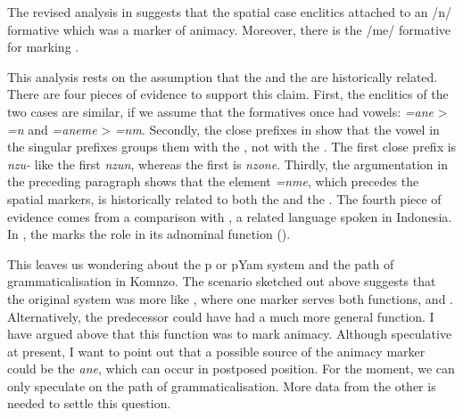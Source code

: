 The revised analysis in  suggests that the spatial case enclitics attached to an /n/  formative which was a marker of animacy. Moreover, there is the /me/ formative for marking  .

This analysis rests on the assumption that the  and the  are historically related. There are four pieces of evidence to support this claim. First, the enclitics of the two cases are similar, if we assume that the  formatives once had vowels: \emph{=ane} > \emph{=n} and \emph{=aneme} > \emph{=nm}. Secondly, the close  prefixes in  show that the vowel in the singular prefixes groups them with the , not with the . The first  close  prefix is \emph{nzu-} like the first    \emph{nzun}, whereas the first    is \emph{nzone}. Thirdly, the argumentation in the preceding paragraph shows that the element \emph{=nme}, which precedes the spatial  markers, is historically related to both the  and the . The fourth piece of evidence comes from a comparison with , a related  language spoken in Indonesia. In , the  marks the  role in its adnominal function (\citealt{Carroll:Ngkolmpu}).

This leaves us wondering about the p or pYam system and the path of grammaticalisation in Komnzo. The scenario sketched out above suggests that the original system was more like , where one  marker serves both functions,  and . Alternatively, the predecessor could have had a much more general function. I have argued above that this function was to mark animacy. Although speculative at present, I want to point out that a possible source of the animacy marker could be the   \emph{ane}, which can occur in postposed position. For the moment, we can only speculate on the path of grammaticalisation. More data from the other  is needed to settle this question.